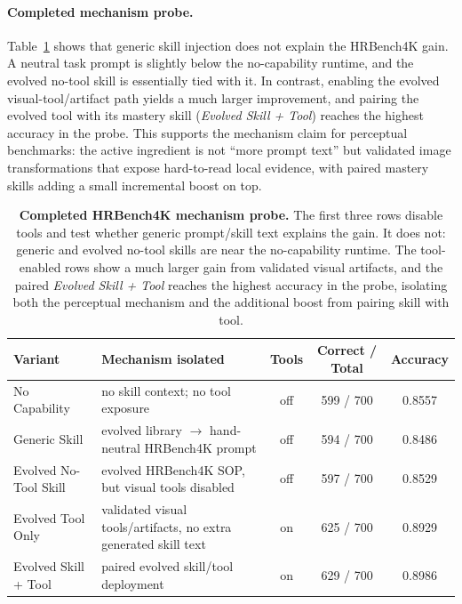 \paragraph{Completed mechanism probe.}
Table~\ref{tab:ablation_mechanism} shows that generic skill injection does not explain
the HRBench4K gain. A neutral task prompt is slightly below the no-capability runtime, and
the evolved no-tool skill is essentially tied with it. In contrast, enabling the evolved
visual-tool/artifact path yields a much larger improvement, and pairing the evolved tool
with its mastery skill (\emph{Evolved Skill + Tool}) reaches the highest accuracy in the
probe. This supports the mechanism claim for perceptual benchmarks: the active ingredient
is not ``more prompt text'' but validated image transformations that expose hard-to-read
local evidence, with paired mastery skills adding a small incremental boost on top.

\begin{table}[t]
\centering
\small
\setlength{\tabcolsep}{4pt}
\renewcommand{\arraystretch}{1.18}
\begin{tabular}{lp{}ccc}
\toprule
\textbf{Variant} & \textbf{Mechanism isolated}
  & \textbf{Tools} & \textbf{Correct / Total} & \textbf{Accuracy} \\
\midrule
No Capability                & no skill context; no tool exposure
  & off & 599 / 700 & 0.8557 \\
Generic Skill                & evolved library $\to$ hand-neutral HRBench4K prompt
  & off & 594 / 700 & 0.8486 \\
Evolved No-Tool Skill        & evolved HRBench4K SOP, but visual tools disabled
  & off & 597 / 700 & 0.8529 \\
\midrule
Evolved Tool Only            & validated visual tools/artifacts, no extra generated skill text
  & on & 625 / 700 & 0.8929 \\
Evolved Skill + Tool         & paired evolved skill/tool deployment
  & on & 629 / 700 & 0.8986 \\
\bottomrule
\end{tabular}
\caption{%
  \textbf{Completed HRBench4K mechanism probe.}
  The first three rows disable tools and test whether generic prompt/skill text explains
  the gain. It does not: generic and evolved no-tool skills are near the no-capability
  runtime. The tool-enabled rows show a much larger gain from validated visual artifacts,
  and the paired \emph{Evolved Skill + Tool} reaches the highest accuracy in the probe,
  isolating both the perceptual mechanism and the additional boost from pairing skill
  with tool.
}
\label{tab:ablation_mechanism}
\end{table}

